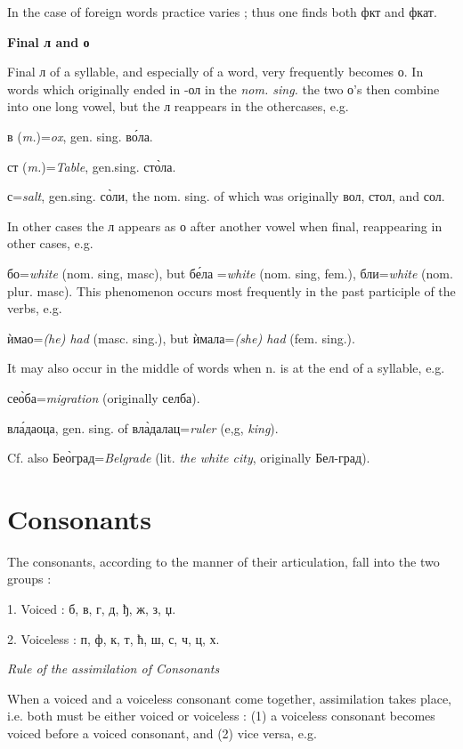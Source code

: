 In the case of foreign words practice varies ; thus one finds both
фкт and фкат. 

\smallskip
{\hfill \large \textbf{Final л and о} \hfill}

Final л of a syllable, and especially of a word, very frequently becomes о.
In words which originally ended in -ол in the \emph{nom. sing.} the two о's
then combine into one long vowel, but the л reappears in the othercases, e.g.

в (\emph{m.})=\emph{ox}, gen. sing. в\'{о}ла. 

ст (\emph{m.})=\emph{Table}, gen.sing. ст\`{о}ла.

с=\emph{salt}, gen.sing. с\`{о}ли, the nom. sing. of which was originally
вол, стол, and сол.

In other cases the л appears as о after another vowel when
final, reappearing in other cases, e.g.

бо=\emph{white} (nom. sing, masc), but б\'{е}ла
=\emph{white} (nom. sing, fem.), бли=\emph{white} (nom. plur. masc).
This phenomenon occurs most frequently in the past participle of the verbs, e.g.

\`{и}мао=\emph{(he) had} (masc. sing.), but \`{и}мала=\emph{(she) had} (fem. sing.). 

\pagebreak

It may also occur in the middle of words when n. is at the end
of a syllable, e.g.

се\`{о}ба=\emph{migration} (originally селба).

вл\'{а}даоца, gen. sing. of вл\`{а}далац=\emph{ruler} (e,g, \emph{king}).

Cf. also Бе\`{о}град=\emph{Belgrade} (lit. \emph{the white city}, originally Бел-град).

\section{Consonants}

The consonants, according to the manner of their
articulation, fall into the two groups :

1. Voiced : б, в, г, д, ђ, ж, з, џ.

2. Voiceless : п, ф, к, т, ћ, ш, с, ч, ц, х.

\smallskip
{\hfill \textit{Rule of the assimilation of Consonants} \hfill}

When a voiced and a voiceless consonant come together,\linebreak
assimilation takes place, i.e. both must be either voiced \linebreak 
or voiceless : (1) a voiceless consonant becomes voiced before
a voiced consonant, and (2) vice versa, e.g.

